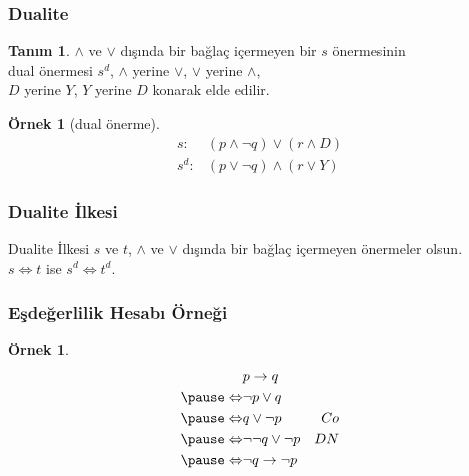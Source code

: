 \documentclass[dvipsnames]{beamer}
\theoremstyle{definition}
\newtheorem{tanim}[theorem]{Tanım}
\theoremstyle{example}
\newtheorem{ornek}[theorem]{Örnek}
\theoremstyle{plain}
\begin{document}
\begin{frame}
  \frametitle{Dualite}

  \begin{tanim}
    $\wedge$ ve $\vee$ dışında bir bağlaç içermeyen bir $s$ önermesinin\\
    \alert{dual} önermesi $s^d$, $\wedge$ yerine $\vee$, $\vee$ yerine $\wedge$,\\
    $D$ yerine $Y$, $Y$ yerine $D$ konarak elde edilir.
  \end{tanim}

  \pause
  \begin{ornek}[dual önerme]
    \begin{eqnarray*}
      s:   & (p \wedge \neg q) \vee (r \wedge D)\\
      s^d: & (p \vee \neg q) \wedge (r \vee Y)
    \end{eqnarray*}
  \end{ornek}
\end{frame}

\begin{frame}
  \frametitle{Dualite İlkesi}

  \begin{block}{Dualite İlkesi}
    $s$ ve $t$, $\wedge$ ve $\vee$ dışında bir bağlaç içermeyen önermeler
    olsun.\\
    $s \Leftrightarrow t$ ise $s^d \Leftrightarrow t^d$.
  \end{block}
\end{frame}

\begin{frame}
  \frametitle{Eşdeğerlilik Hesabı Örneği}

  \begin{ornek}
    \begin{eqnarray*}
                      & p \rightarrow q           &\\
      \pause
      \Leftrightarrow & \neg p \vee q             &\\
      \pause
      \Leftrightarrow & q \vee \neg p             & Co\\
      \pause
      \Leftrightarrow & \neg \neg q \vee \neg p   & DN\\
      \pause
      \Leftrightarrow & \neg q \rightarrow \neg p &
    \end{eqnarray*}
  \end{ornek}
\end{frame}
\end{document}
